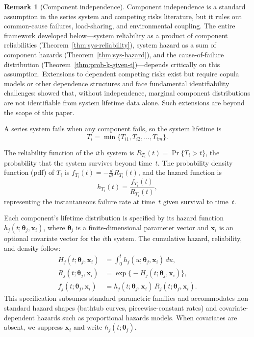 \documentclass[11pt]{article}
\theoremstyle{definition}
\newtheorem{remark}{Remark}
\theoremstyle{plain}
\renewcommand{\v}[1]{\boldsymbol{#1}}
\begin{document}
\begin{remark}[Component independence]
\label{rem:independence}
Component independence is a standard assumption in the series system
and competing risks literature, but it rules out common-cause failures,
load-sharing, and environmental coupling.
The entire framework developed below---system reliability as a product
of component reliabilities (Theorem~\ref{thm:sys-reliability}), system
hazard as a sum of component hazards (Theorem~\ref{thm:sys-hazard}),
and the cause-of-failure distribution
(Theorem~\ref{thm:prob-k-given-t})---depends critically on this
assumption.
Extensions to dependent competing risks exist but require copula models
or other dependence structures and face fundamental identifiability
challenges: \citet{tsiatis1975} showed that, without independence,
marginal component distributions are not identifiable from system
lifetime data alone.
Such extensions are beyond the scope of this paper.
\end{remark}

A series system fails when any component fails, so the system lifetime is
\begin{equation}
\label{eq:series-def}
    T_i = \min\bigl\{T_{i1}, T_{i2}, \ldots, T_{im}\bigr\}.
\end{equation}

The reliability function of the $i$th system is
$R_{T_i}(t) = \Pr\{T_i > t\}$,
the probability that the system survives beyond time~$t$.
The probability density function (pdf) of $T_i$ is
$f_{T_i}(t) = -\frac{d}{dt} R_{T_i}(t)$,
and the hazard function is
\begin{equation}
\label{eq:hazard-def}
    h_{T_i}(t) = \frac{f_{T_i}(t)}{R_{T_i}(t)},
\end{equation}
representing the instantaneous failure rate at time~$t$ given survival to
time~$t$.

Each component's lifetime distribution is specified by its hazard
function $h_j(t; \v{\theta}_j, \v{x}_i)$, where $\v{\theta}_j$ is a
finite-dimensional parameter vector and $\v{x}_i$ is an optional
covariate vector for the $i$th system.
The cumulative hazard, reliability, and density follow:
\begin{align}
\label{eq:cumhaz-def}
    H_j(t; \v{\theta}_j, \v{x}_i)
    &= \int_0^t h_j(u; \v{\theta}_j, \v{x}_i) \, du, \\
\label{eq:rel-from-haz}
    R_j(t; \v{\theta}_j, \v{x}_i)
    &= \exp\bigl\{-H_j(t; \v{\theta}_j, \v{x}_i)\bigr\}, \\
\label{eq:pdf-from-haz}
    f_j(t; \v{\theta}_j, \v{x}_i)
    &= h_j(t; \v{\theta}_j, \v{x}_i) \, R_j(t; \v{\theta}_j, \v{x}_i).
\end{align}
This specification subsumes standard parametric families and
accommodates non-standard hazard shapes (bathtub curves,
piecewise-constant rates) and covariate-dependent hazards such as
proportional hazards models.
When covariates are absent, we suppress $\v{x}_i$ and write
$h_j(t; \v{\theta}_j)$.
\end{document}
